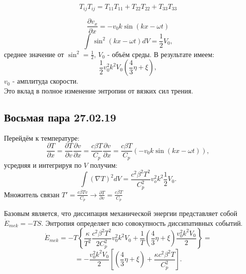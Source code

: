 \documentclass[14pt,a4paper,oneside]{extarticle}	%
\begin{document}
\begin{equation*}
T_{ij}T_{ij} = T_{11}T_{11} + T_{22}T_{22} + T_{33}T_{33}
\end{equation*}


\begin{equation*}
\frac{\partial v_{x}}{\partial x} = -v_{0}k\sin(kx-\omega t)
\end{equation*}
\begin{equation*}
\int\sin^{2}(kx-\omega t)dV = \frac{1}{2}V_{0},
\end{equation*}
среднее значение от $  \sin^{2}  = \frac{1}{2} $, $ V_{0} $ - объём среды.
В результате имеем:
\begin{equation*}
\frac{1}{2}v_{0}^{2}k^{2}V_{0}\left( \frac{4}{3}\eta + \xi\right),
\end{equation*}
$ v_{0} $ - амплитуда скорости.\\
Это вклад в полное изменение энтропии от вязких сил трения.

\newpage
\begin{center}
	\section*{Восьмая пара 27.02.19} %
\end{center}

Перейдём к температуре:
\begin{equation*}
\frac{\partial T}{\partial x} = \frac{\partial T}{\partial v}\frac{\partial v}{\partial x} = \frac{c\beta T}{C_{p}}\frac{\partial v}{\partial x} = \frac{c\beta T}{C_{p}}\left(-v_{0}k\sin(kx-\omega t) \right),
\end{equation*}
усредняя и интегрируя по $ V $ получим:
\begin{equation*}
\int \left( \nabla T\right)^{2}dV = \frac{c^{2}\beta^{2}T^{2}}{C_{p}^{2}}v_{o}^{2}k^{2}\frac{1}{2}V_{0}.
\end{equation*}
Множитель связан $ T' = \frac{c\beta Tv}{C_{p}} \longrightarrow \frac{\partial T}{\partial v} =  \frac{c\beta T}{C_{p}} $

Базовым является, что диссипация механической энергии представляет собой $ \dot{E}_{mek} = -TS $.
Энтропия определяет всю совокупность диссипативных событий.
\begin{equation*}
\dot{E}_{mek} = -T\left\lbrace\frac{\kappa}{T^{2}} \frac{c^{2}\beta^{2}T^{2}}{2C_{p}^{2}}v_{0}^{2}k^{2}V_{0}+\frac{1}{T}\left( \frac{4}{3}\eta + \xi\right)\frac{v_{0}^{2}k^{2}V_{0}}{2} \right\rbrace = 
\end{equation*}
\begin{equation}\label{68}
 =-\frac{v_{0}^{2}k^{2}V_{0}}{2}\left[\left( \frac{4}{3}\eta + \xi\right) + \frac{\kappa c^{2}\beta^{2}T}{C_{p}^{2}} \right].
\end{equation}
\end{document}
